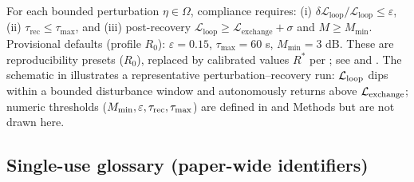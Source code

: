 \documentclass[11pt]{article}
\begin{document}
For each bounded perturbation $\eta \in \Omega$, compliance requires: (i) $\delta\mathcal{L}_{\text{loop}}/\mathcal{L}_{\text{loop}} \leq \varepsilon$, (ii) $\tau_{\text{rec}} \leq \tau_{\max}$, and (iii) post-recovery $\mathcal{L}_{\text{loop}} \geq \mathcal{L}_{\text{exchange}} + \sigma$ and $M \geq M_{\min}$. Provisional defaults (profile $R_0$): $\varepsilon = 0.15$, $\tau_{\max} = 60$ s, $M_{\min} = 3$ dB. These are reproducibility presets ($R_0$), replaced by calibrated values $R^*$ per ; see  and . The schematic in  illustrates a representative perturbation--recovery run: $\mathcal{L}_{\text{loop}}$ dips within a bounded disturbance window and autonomously returns above $\mathcal{L}_{\text{exchange}}$; numeric thresholds ($M_{\min}, \varepsilon, \tau_{\text{rec}}, \tau_{\max}$) are defined in  and Methods  but are not drawn here.


\subsection{Single-use glossary (paper-wide identifiers)}
\label{sec:glossary}
\end{document}
